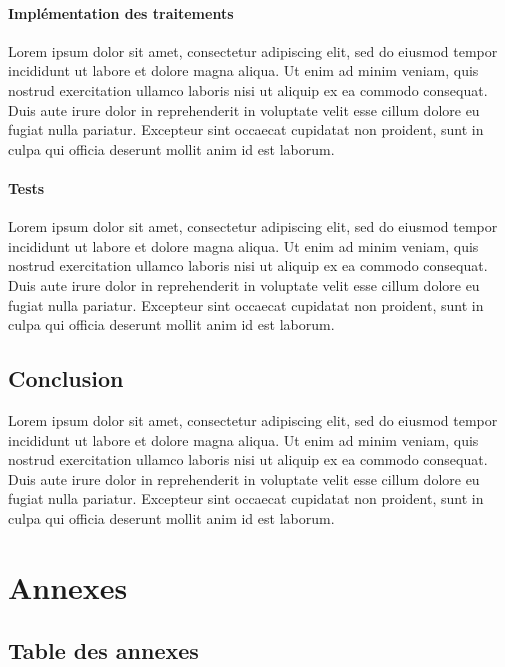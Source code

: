 \documentclass[a4paper, 12pt]{report}
\begin{document}
\subsection{Implémentation des traitements}

Lorem ipsum dolor sit amet, consectetur adipiscing elit, sed do eiusmod tempor incididunt ut labore et dolore magna aliqua. Ut enim ad minim veniam, quis nostrud exercitation ullamco laboris nisi ut aliquip ex ea commodo consequat. Duis aute irure dolor in reprehenderit in voluptate velit esse cillum dolore eu fugiat nulla pariatur. Excepteur sint occaecat cupidatat non proident, sunt in culpa qui officia deserunt mollit anim id est laborum.

\subsection{Tests}

Lorem ipsum dolor sit amet, consectetur adipiscing elit, sed do eiusmod tempor incididunt ut labore et dolore magna aliqua. Ut enim ad minim veniam, quis nostrud exercitation ullamco laboris nisi ut aliquip ex ea commodo consequat. Duis aute irure dolor in reprehenderit in voluptate velit esse cillum dolore eu fugiat nulla pariatur. Excepteur sint occaecat cupidatat non proident, sunt in culpa qui officia deserunt mollit anim id est laborum.

\chapter*{Conclusion}

Lorem ipsum dolor sit amet, consectetur adipiscing elit, sed do eiusmod tempor incididunt ut labore et dolore magna aliqua. Ut enim ad minim veniam, quis nostrud exercitation ullamco laboris nisi ut aliquip ex ea commodo consequat. Duis aute irure dolor in reprehenderit in voluptate velit esse cillum dolore eu fugiat nulla pariatur. Excepteur sint occaecat cupidatat non proident, sunt in culpa qui officia deserunt mollit anim id est laborum.

\part{Annexes}
\renewcommand{\clearpage}{}
\chapter*{Table des annexes}
\renewcommand\ptctitle{}
\parttoc
\thispagestyle{empty}
\renewcommand{\clearpage}{\newpage}
\appendix
\end{document}
